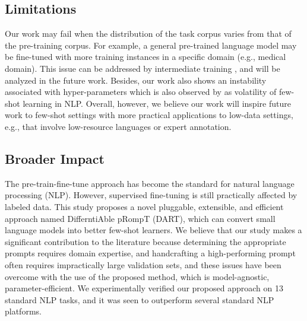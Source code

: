 \documentclass{article} \usepackage{iclr2022_conference,times}
\begin{document}
\subsection{Limitations}\label{limit}
Our work may fail when the distribution of the task corpus varies from that of the pre-training corpus. 
For example, a general pre-trained language model may be fine-tuned with more training instances in a specific domain (e.g., medical domain).
This issue can be addressed by intermediate training \citep{DBLP:journals/corr/abs-1811-01088,DBLP:conf/emnlp/YinRRSX20,DBLP:journals/corr/abs-2102-09690}, and will be analyzed in the future work.
Besides, our work also shows an instability associated with hyper-parameters which is also observed by \cite{DBLP:journals/corr/abs-2002-06305,zhang2021revisiting,Ethan2021true} as volatility of few-shot learning in NLP.  
Overall, however, we believe our work will inspire future work to few-shot settings with more practical applications to low-data settings, e.g., that involve low-resource languages or expert annotation.

\subsection{Broader Impact}

The pre-train-fine-tune approach has become the standard for natural language processing (NLP). 
However, supervised fine-tuning is still practically affected by labeled data.
This study proposes a novel pluggable, extensible, and efficient approach named DifferntiAble pRompT (DART), which can convert small language models into better few-shot learners. 
We believe that our study makes a significant contribution to the literature because determining the appropriate prompts requires domain expertise, and handcrafting a high-performing prompt often requires impractically large validation sets, and these issues have been overcome with the use of the proposed method, which is model-agnostic, parameter-efficient. We experimentally verified our proposed approach on 13 standard NLP tasks, and it was seen to outperform several standard NLP platforms.
\end{document}
